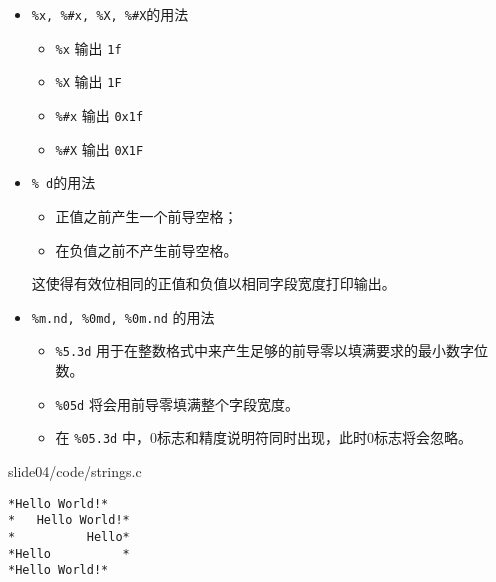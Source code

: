 \begin{frame}[fragile] 
  \begin{itemize}
  \item \lstinline|%x, %#x, %X, %#X|的用法
    \begin{itemize}
    \item \lstinline|%x| 输出 \lstinline|1f| \\[0.05in]
    \item \lstinline|%X| 输出 \lstinline|1F| \\[0.05in]
    \item \lstinline|%#x| 输出 \lstinline|0x1f| \\[0.05in]
    \item \lstinline|%#X| 输出 \lstinline|0X1F|
    \end{itemize} \vspace{.1in}
    
  \item \lstinline|% d|的用法
    \begin{itemize}
    \item 正值之前产生一个前导空格；\\[0.05in]
    \item 在负值之前不产生前导空格。    
    \end{itemize}
    这使得有效位相同的正值和负值以相同字段宽度打印输出。 \vspace{.1in}
    
  \item \lstinline|%m.nd, %0md, %0m.nd| 的用法
    \begin{itemize}
    \item\lstinline|%5.3d| 用于在整数格式中来产生足够的前导零以填满要求的最小数字位数。\\[0.05in]
    \item \lstinline|%05d| 将会用前导零填满整个字段宽度。\\[0.05in]
    \item 在 \lstinline|%05.3d| 中，0标志和精度说明符同时出现，此时0标志将会忽略。
    \end{itemize}

  \end{itemize}
\end{frame}

\begin{frame}[fragile]
  
  {slide04/code/strings.c}    \pause 

\begin{lstlisting}[showspaces=true,basicstyle=\ttfamily\small]
*Hello World!*
*   Hello World!*
*          Hello*
*Hello          *
*Hello World!*
\end{lstlisting}

\end{frame}

